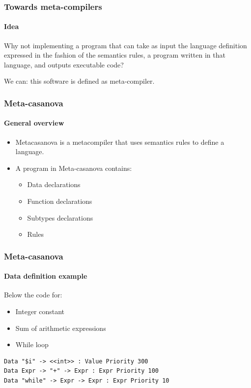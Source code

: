 \documentclass[mathserif,serif]{beamer}
\begin{document}
\begin{frame}
	\frametitle{Towards meta-compilers}
	\framesubtitle{Idea}
	
	\large
	\color{red}
	Why not implementing a program that can take as input the language definition expressed in the fashion of the semantics rules, a program written in that language, and outputs executable code?

	\pause
	
	\vspace{1cm}
	\color{black}
	We can: this software is defined as meta-compiler.
\end{frame}

\begin{frame}
	\frametitle{Meta-casanova}
	\framesubtitle{General overview}
	
	\begin{itemize}
		\item Metacasanova is a metacompiler that uses semantics rules to define a language.
		\item A program in Meta-casanova contains:
		\begin{itemize}
			\item Data declarations
			\item Function declarations
			\item Subtypes declarations
			\item Rules
		\end{itemize}
	\end{itemize}

\end{frame}

\begin{frame}[fragile]
	\frametitle{Meta-casanova}
	\framesubtitle{Data definition example}
	
	Below the code for:
	\begin{itemize}
		\item Integer constant
		\item Sum of arithmetic expressions
		\item While loop
	\end{itemize}
	
	\begin{lstlisting}
Data "$i" -> <<int>> : Value Priority 300
Data Expr -> "+" -> Expr : Expr Priority 100
Data "while" -> Expr -> Expr : Expr Priority 10
	\end{lstlisting}
\end{frame}
\end{document}
